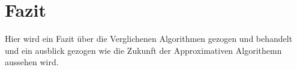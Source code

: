 \section{Fazit}
Hier wird ein Fazit über die Verglichenen Algorithmen gezogen und behandelt und ein ausblick gezogen wie die Zukunft der Approximativen Algorithemn aussehen wird.